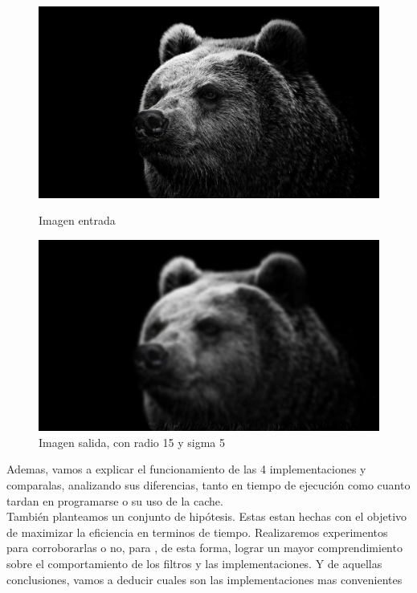 \begin{figure}[H]
\begin{center}

  \includegraphics[width=\linewidth]{img/sd(1).png}
  \caption{{\small Imagen entrada}} 
\endminipage

  \includegraphics[width=\linewidth]{img/sd.png}
  \caption{{\small Imagen salida, con radio 15 y sigma 5}}
\endminipage

\end{center}
\end{figure}

Ademas, vamos a explicar el funcionamiento de las 4 implementaciones y comparalas, analizando sus diferencias, tanto en tiempo de ejecución como cuanto tardan en programarse o su uso de la cache. \\
También planteamos un conjunto de hipótesis. Estas estan hechas con el objetivo de maximizar la eficiencia en terminos de tiempo. Realizaremos experimentos para corroborarlas o no, para , de esta forma, lograr un mayor comprendimiento sobre el comportamiento de los filtros y las implementaciones. Y de aquellas conclusiones, vamos a deducir cuales son las implementaciones mas convenientes  \\

